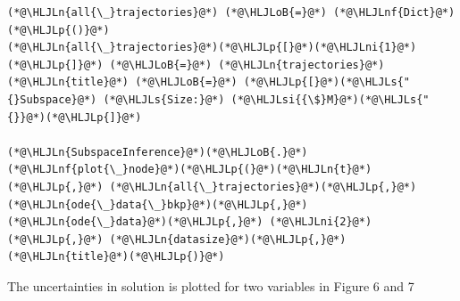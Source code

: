 \documentclass[12pt,a4paper]{article}
\newcommand{\HLJLn}[1]{#1}
\newcommand{\HLJLnf}[1]{\textcolor[RGB]{66,102,213}{#1}}
\newcommand{\HLJLs}[1]{\textcolor[RGB]{201,61,57}{#1}}
\newcommand{\HLJLsi}[1]{#1}
\newcommand{\HLJLni}[1]{\textcolor[RGB]{59,151,46}{#1}}
\newcommand{\HLJLoB}[1]{\textcolor[RGB]{102,102,102}{\textbf{#1}}}
\newcommand{\HLJLp}[1]{#1}
\begin{document}
\begin{lstlisting}
(*@\HLJLn{all{\_}trajectories}@*) (*@\HLJLoB{=}@*) (*@\HLJLnf{Dict}@*)(*@\HLJLp{()}@*)
(*@\HLJLn{all{\_}trajectories}@*)(*@\HLJLp{[}@*)(*@\HLJLni{1}@*)(*@\HLJLp{]}@*) (*@\HLJLoB{=}@*) (*@\HLJLn{trajectories}@*)
(*@\HLJLn{title}@*) (*@\HLJLoB{=}@*) (*@\HLJLp{[}@*)(*@\HLJLs{"{}Subspace}@*) (*@\HLJLs{Size:}@*) (*@\HLJLsi{{\$}M}@*)(*@\HLJLs{"{}}@*)(*@\HLJLp{]}@*)

(*@\HLJLn{SubspaceInference}@*)(*@\HLJLoB{.}@*)(*@\HLJLnf{plot{\_}node}@*)(*@\HLJLp{(}@*)(*@\HLJLn{t}@*)(*@\HLJLp{,}@*) (*@\HLJLn{all{\_}trajectories}@*)(*@\HLJLp{,}@*) (*@\HLJLn{ode{\_}data{\_}bkp}@*)(*@\HLJLp{,}@*) (*@\HLJLn{ode{\_}data}@*)(*@\HLJLp{,}@*) (*@\HLJLni{2}@*)(*@\HLJLp{,}@*) (*@\HLJLn{datasize}@*)(*@\HLJLp{,}@*) (*@\HLJLn{title}@*)(*@\HLJLp{)}@*)
\end{lstlisting}

The uncertainties in solution is plotted for two variables in Figure 6 and 7
\end{document}
